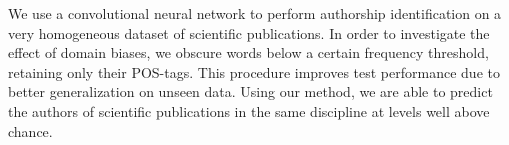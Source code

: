 We use a convolutional neural network to perform authorship identification on a very homogeneous dataset of scientific publications. In order to investigate the effect of domain biases, we obscure words below a certain frequency threshold, retaining only their POS-tags. This procedure improves test performance due to better generalization on unseen data. Using our method, we are able to predict the authors of scientific publications in the same discipline at levels well above chance.

